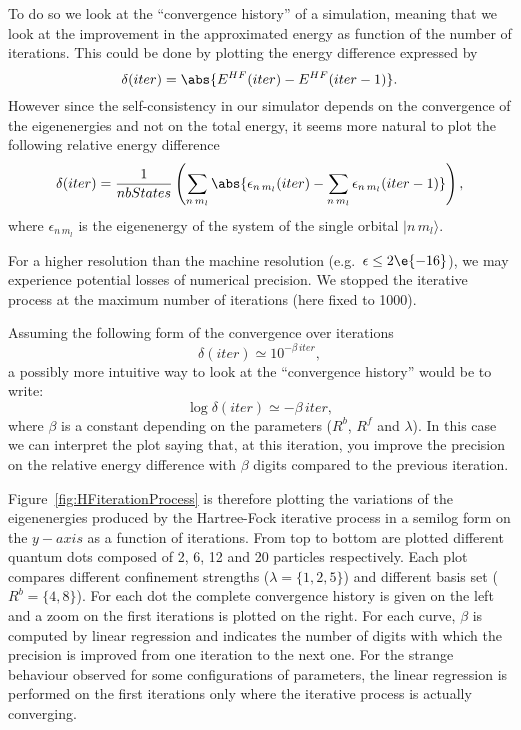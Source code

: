 To do so we look at the ``convergence history'' of a simulation, meaning that we look at the improvement in the approximated energy as function of the number of  iterations. This could be done by plotting the energy difference expressed by
\begin{equation*}
\delta (iter)= \abs{E^{HF}(iter)-E^{HF}(iter-1)}.
\end{equation*}
However since the self-consistency in our simulator depends on the convergence of the eigenenergies and not on the total energy, it seems more natural to plot the following relative energy difference
\begin{equation*}
\delta (iter)= \frac{1}{nbStates} \left( \sum_{n\,m_l} \abs{\epsilon_{n\,m_l}(iter)-\sum_{n\,m_l} \epsilon_{n\,m_l}(iter-1)} \right),
\end{equation*}
where $\epsilon_{n\,m_l}$ is the eigenenergy of the system of the single orbital $|n\,m_l \rangle$.

For a higher resolution than the machine resolution (e.g.\ $\epsilon \leq 2\e{-16}$), we may experience potential losses of numerical precision. We stopped the iterative process at the maximum number of iterations (here fixed to 1000). 



Assuming the following form of the convergence over iterations
\begin{equation*}
\delta (iter) \simeq 10^{- \beta \, iter},
\end{equation*}
a possibly more intuitive way to look at the ``convergence history'' would be to write:
\begin{equation*}
\log\delta (iter) \simeq - \beta \, iter,
\end{equation*}
where $\beta$ is a constant depending on the parameters ($R^b$, $R^f$ and $\lambda$). In this case we can interpret the plot saying that, at this iteration, you improve the precision on the relative energy difference with $\beta$ digits compared to the previous iteration.

Figure~\ref{fig:HFiterationProcess} is therefore plotting the variations of the eigenenergies produced by the Hartree-Fock iterative process in a semilog form on the $y-axis$ as a function of iterations. From top to bottom are plotted different quantum dots composed of 2, 6, 12 and 20 particles respectively. Each plot compares different confinement strengths ($\lambda=\{1,2,5\}$) and different basis set ($R^b= \{ 4,8 \}$). For each dot the complete convergence history is given on the left and a zoom on the first iterations is plotted on the right. For each curve, $\beta$ is computed by linear regression and indicates the number of digits with which the precision is improved from one iteration to the next one. For the strange behaviour observed for some configurations of parameters, the linear regression is performed on the first iterations only where the iterative process is actually converging.

